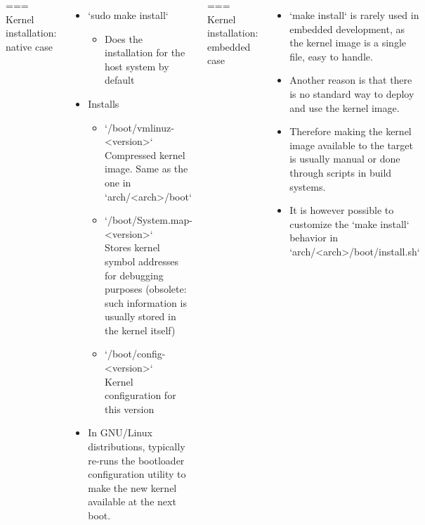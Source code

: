\begin{columns}[T]
=== Kernel installation: native case
  \begin{itemize}
  \item `sudo make install`
    \begin{itemize}
    \item Does the installation for the host system by default
    \end{itemize}
  \item Installs
    \begin{itemize}
    \item `/boot/vmlinuz-<version>` \\
      Compressed kernel image. Same as the one in
      `arch/<arch>/boot`
    \item `/boot/System.map-<version>`\\
      Stores kernel symbol addresses for debugging purposes
      (obsolete: such information is usually stored in the kernel itself)
    \item `/boot/config-<version>`\\
      Kernel configuration for this version
    \end{itemize}
  \item In GNU/Linux distributions, typically re-runs the bootloader configuration
    utility to make the new kernel available at the next boot.
  \end{itemize}


=== Kernel installation: embedded case
  \begin{itemize}
  \item `make install` is rarely used in embedded development, as the
    kernel image is a single file, easy to handle.
  \item Another reason is that there is no standard way to deploy and
    use the kernel image.
  \item Therefore making the kernel image available to the target is
    usually manual or done through scripts in build systems.
  \item It is however possible to customize the `make install`
    behavior in `arch/<arch>/boot/install.sh`
  \end{itemize}



\end{columns}
